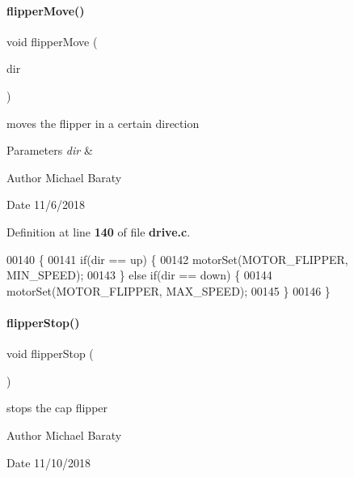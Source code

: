 \paragraph{flipper\+Move()}
{\footnotesize\ttfamily void flipper\+Move (\begin{DoxyParamCaption}\item[{\textbf{ Flipper\+Direction}}]{dir }\end{DoxyParamCaption})}



moves the flipper in a certain direction 


\begin{DoxyParams}{Parameters}
{\em dir} & \\
\hline
\end{DoxyParams}
\begin{DoxyAuthor}{Author}
Michael Baraty 
\end{DoxyAuthor}
\begin{DoxyDate}{Date}
11/6/2018 
\end{DoxyDate}


Definition at line \textbf{ 140} of file \textbf{ drive.\+c}.


\begin{DoxyCode}
00140                                        \{
00141   \textcolor{keywordflow}{if}(dir == up) \{
00142     motorSet(MOTOR_FLIPPER, MIN_SPEED);
00143   \} \textcolor{keywordflow}{else} \textcolor{keywordflow}{if}(dir == down) \{
00144     motorSet(MOTOR_FLIPPER, MAX_SPEED);
00145   \}
00146 \}
\end{DoxyCode}
\mbox{\label{drive_8h_ad2b33937a785dc4201bcae5b6ed66b9f}} 
\paragraph{flipper\+Stop()}
{\footnotesize\ttfamily void flipper\+Stop (\begin{DoxyParamCaption}{ }\end{DoxyParamCaption})}



stops the cap flipper 

\begin{DoxyAuthor}{Author}
Michael Baraty 
\end{DoxyAuthor}
\begin{DoxyDate}{Date}
11/10/2018 
\end{DoxyDate}


